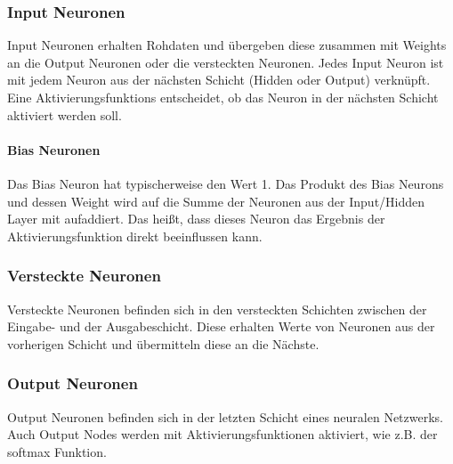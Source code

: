 \subsubsection{Input Neuronen}
Input Neuronen erhalten Rohdaten und übergeben diese zusammen mit Weights an die Output Neuronen oder die versteckten Neuronen. Jedes Input Neuron ist mit jedem Neuron aus der nächsten Schicht 
(Hidden oder Output) verknüpft. Eine Aktivierungsfunktions entscheidet, ob das Neuron in der nächsten Schicht aktiviert werden soll. \cite{CA18}
\paragraph{Bias Neuronen}
Das Bias Neuron hat typischerweise den Wert 1. Das Produkt des Bias Neurons und dessen Weight wird auf die Summe der Neuronen aus der Input/Hidden Layer mit aufaddiert. Das heißt, dass dieses Neuron
das Ergebnis der Aktivierungsfunktion direkt beeinflussen kann. \cite{CA18}
\subsubsection{Versteckte Neuronen}
Versteckte Neuronen befinden sich in den versteckten Schichten zwischen der Eingabe- und der Ausgabeschicht. Diese erhalten Werte von Neuronen aus der vorherigen Schicht und übermitteln diese an die Nächste. \cite{CA18}
\subsubsection{Output Neuronen}
Output Neuronen befinden sich in der letzten Schicht eines neuralen Netzwerks. Auch Output Nodes werden mit Aktivierungsfunktionen aktiviert, wie z.B. der softmax Funktion. \cite{CA18}

